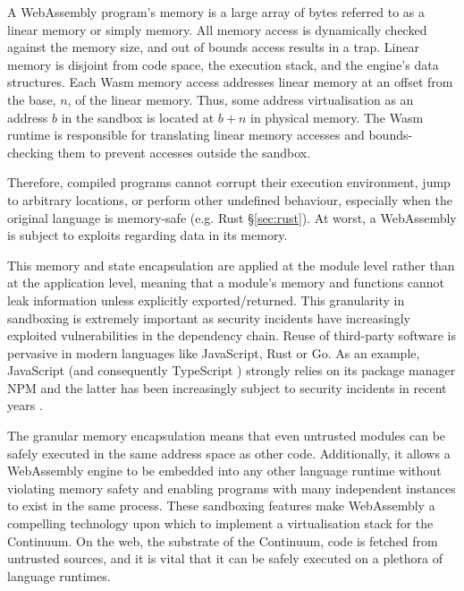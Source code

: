 A WebAssembly program's memory is a large array of bytes referred to as a linear memory or simply memory. All memory access is dynamically checked against the memory size, and out of bounds access results in a trap. Linear memory is disjoint from code space, the execution stack, and the engine's data structures. Each Wasm memory access addresses linear memory at an offset from the base, $n$, of the linear memory. Thus, some address virtualisation as an address $b$ in the sandbox is located at $b + n$ in physical memory. The Wasm runtime is responsible for translating linear memory accesses and bounds-checking them to prevent accesses outside the sandbox.

Therefore, compiled programs cannot corrupt their execution environment, jump to arbitrary locations, or perform other undefined behaviour, especially when the original language is memory-safe (e.g. Rust §\ref{sec:rust}). At worst, a WebAssembly is subject to exploits regarding data in its memory.

This memory and state encapsulation are applied at the module level rather than at the application level, meaning that a module's memory and functions cannot leak information unless explicitly exported/returned. This granularity in sandboxing is extremely important as security incidents have increasingly exploited vulnerabilities in the dependency chain. Reuse of third-party software is pervasive in modern languages like JavaScript, Rust or Go. As an example, JavaScript (and consequently TypeScript \cite{typescript}) strongly relies on its package manager NPM and the latter has been increasingly subject to security incidents in recent years \cite{npm-security}.

The granular memory encapsulation means that even untrusted modules can be safely executed in the same address space as other code. Additionally, it allows a WebAssembly engine to be embedded into any other language runtime without violating memory safety and enabling programs with many independent instances to exist in the same process. These sandboxing features make WebAssembly a compelling technology upon which to implement a virtualisation stack for the Continuum. On the web, the substrate of the Continuum, code is fetched from untrusted sources, and it is vital that it can be safely executed on a plethora of language runtimes.


